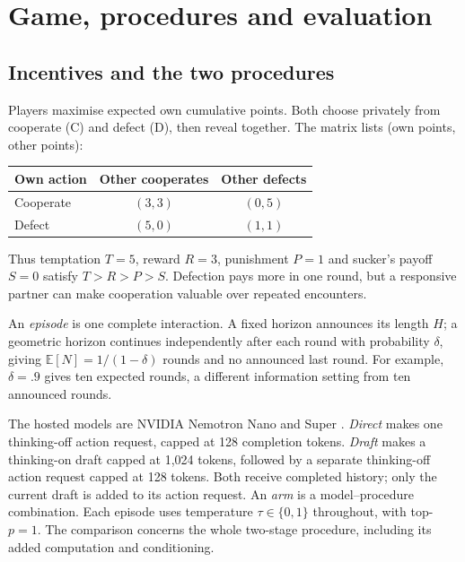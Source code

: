 \documentclass[11pt,a4paper]{article}
\newcommand{\E}{\mathbb E}
\begin{document}
\section{Game, procedures and evaluation}
\subsection{Incentives and the two procedures}
Players maximise expected own cumulative points. Both choose privately from
cooperate (C) and defect (D), then reveal together. The matrix lists
(own points, other points):
\begin{center}
\begin{tabular}{lcc}
\toprule
Own action & Other cooperates & Other defects\\
\midrule
Cooperate & $(3,3)$ & $(0,5)$\\
Defect & $(5,0)$ & $(1,1)$\\
\bottomrule
\end{tabular}
\end{center}
Thus temptation $T=5$, reward $R=3$, punishment $P=1$ and sucker's payoff
$S=0$ satisfy $T>R>P>S$. Defection pays more in one round, but a responsive
partner can make cooperation valuable over repeated encounters.

An \emph{episode} is one complete interaction. A fixed horizon announces its
length $H$; a geometric horizon continues independently after each round with
probability $\delta$, giving $\E[N]=1/(1-\delta)$ rounds and no announced last
round. For example, $\delta=.9$ gives ten expected rounds, a different
information setting from ten announced rounds.

The hosted models are NVIDIA Nemotron Nano and Super \cite{nano,super,cards}.
\emph{Direct} makes one thinking-off action request, capped at 128 completion
tokens. \emph{Draft} makes a thinking-on draft capped at 1,024 tokens, followed
by a separate thinking-off action request capped at 128 tokens. Both receive
completed history; only the current draft is added to its action request.
An \emph{arm} is a model--procedure combination. Each episode uses temperature
$\tau\in\{0,1\}$ throughout, with top-$p=1$. The comparison concerns the whole
two-stage procedure, including its added computation and conditioning.
\end{document}
